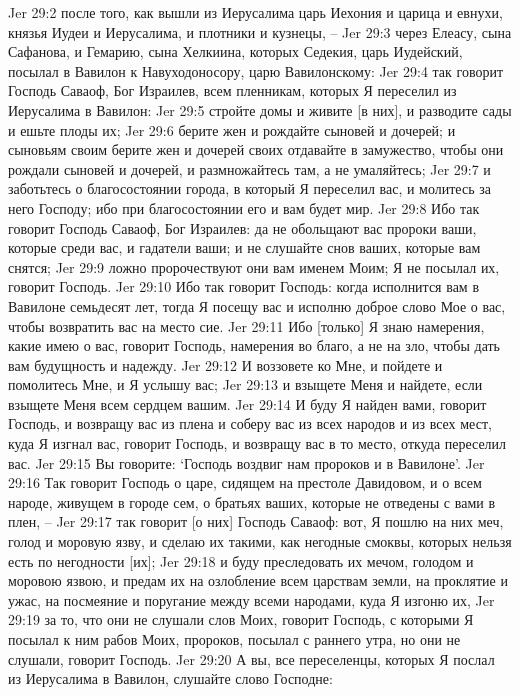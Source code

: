 Jer 29:2  после того, как вышли из Иерусалима царь Иехония и царица и евнухи, князья Иудеи и Иерусалима, и плотники и кузнецы, --
Jer 29:3  через Елеасу, сына Сафанова, и Гемарию, сына Хелкиина, которых Седекия, царь Иудейский, посылал в Вавилон к Навуходоносору, царю Вавилонскому:
Jer 29:4  так говорит Господь Саваоф, Бог Израилев, всем пленникам, которых Я переселил из Иерусалима в Вавилон:
Jer 29:5  стройте домы и живите [в них], и разводите сады и ешьте плоды их;
Jer 29:6  берите жен и рождайте сыновей и дочерей; и сыновьям своим берите жен и дочерей своих отдавайте в замужество, чтобы они рождали сыновей и дочерей, и размножайтесь там, а не умаляйтесь;
Jer 29:7  и заботьтесь о благосостоянии города, в который Я переселил вас, и молитесь за него Господу; ибо при благосостоянии его и вам будет мир.
Jer 29:8  Ибо так говорит Господь Саваоф, Бог Израилев: да не обольщают вас пророки ваши, которые среди вас, и гадатели ваши; и не слушайте снов ваших, которые вам снятся;
Jer 29:9  ложно пророчествуют они вам именем Моим; Я не посылал их, говорит Господь.
Jer 29:10  Ибо так говорит Господь: когда исполнится вам в Вавилоне семьдесят лет, тогда Я посещу вас и исполню доброе слово Мое о вас, чтобы возвратить вас на место сие.
Jer 29:11  Ибо [только] Я знаю намерения, какие имею о вас, говорит Господь, намерения во благо, а не на зло, чтобы дать вам будущность и надежду.
Jer 29:12  И воззовете ко Мне, и пойдете и помолитесь Мне, и Я услышу вас;
Jer 29:13  и взыщете Меня и найдете, если взыщете Меня всем сердцем вашим.
Jer 29:14  И буду Я найден вами, говорит Господь, и возвращу вас из плена и соберу вас из всех народов и из всех мест, куда Я изгнал вас, говорит Господь, и возвращу вас в то место, откуда переселил вас.
Jer 29:15  Вы говорите: `Господь воздвиг нам пророков и в Вавилоне'.
Jer 29:16  Так говорит Господь о царе, сидящем на престоле Давидовом, и о всем народе, живущем в городе сем, о братьях ваших, которые не отведены с вами в плен, --
Jer 29:17  так говорит [о них] Господь Саваоф: вот, Я пошлю на них меч, голод и моровую язву, и сделаю их такими, как негодные смоквы, которых нельзя есть по негодности [их];
Jer 29:18  и буду преследовать их мечом, голодом и моровою язвою, и предам их на озлобление всем царствам земли, на проклятие и ужас, на посмеяние и поругание между всеми народами, куда Я изгоню их,
Jer 29:19  за то, что они не слушали слов Моих, говорит Господь, с которыми Я посылал к ним рабов Моих, пророков, посылал с раннего утра, но они не слушали, говорит Господь.
Jer 29:20  А вы, все переселенцы, которых Я послал из Иерусалима в Вавилон, слушайте слово Господне:
